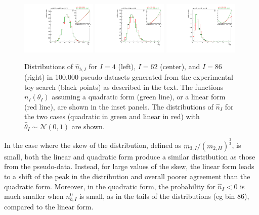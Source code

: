 \documentclass[11pt]{article}
\begin{document}
\begin{figure}%
  \centering
  \includegraphics[width=0.32\textwidth]{figures/distribution_4}
  \includegraphics[width=0.32\textwidth]{figures/distribution_62}
  \includegraphics[width=0.32\textwidth]{figures/distribution_86}
  \caption{Distributions of $\hat{n}_{b,I}$ for $I=4$ (left), $I=62$ (center), and $I=86$ (right) in 100,000 pseudo-datasets generated from the experimental toy search (black points) as described in the text.
    The functions $n_{I}(\theta_{I})$ assuming a quadratic form (green line), or
    a linear form (red line), are shown in the inset panels.  The distributions
    of $\hat{n}_{I}$ for the two cases (quadratic in green and linear in red)
    with $\hat{\theta}_{I}\sim\mathcal{N}(0,1)$ are shown.  }
  \label{fig:distributions}
\end{figure}

In the case where the skew of the distribution, defined as $m_{3,I}/(m_{2,II})^{\frac{3}{2}}$, is small,
both the linear and quadratic form produce a similar distribution as those from the pseudo-data.
Instead, for large values of the skew, the linear form leads to a shift of the peak in the distribution and overall poorer
agreement than the quadratic form. Moreover, in the quadratic form, the probability for $\hat{n}_{I}<0$
is much smaller when $n^{0}_{b,I}$ is small, as in the tails of the distributions (eg bin $86$), compared to the linear form.
\end{document}
